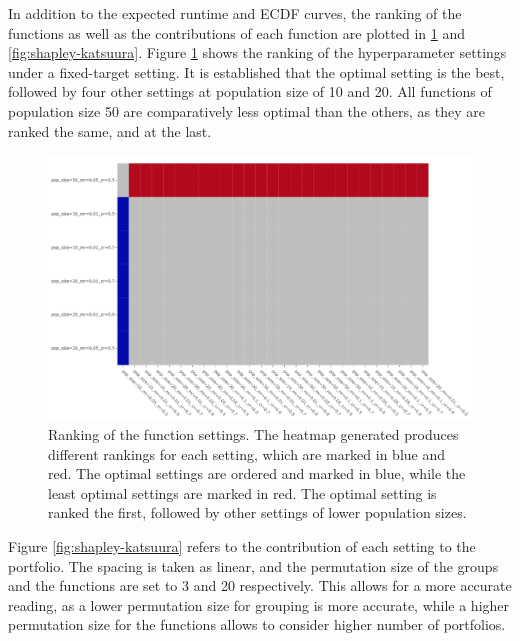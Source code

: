 \documentclass{article}
\begin{document}
In addition to the expected runtime and ECDF curves, the ranking of the functions as well as the contributions of each function are plotted in \ref{fig:ranking-Katsuura} and \ref{fig:shapley-katsuura}. Figure \ref{fig:ranking-Katsuura} shows the ranking of the hyperparameter settings under a fixed-target setting. It is established that the optimal setting is the best, followed by four other settings at population size of 10 and 20. All functions of population size 50 are comparatively less optimal than the others, as they are ranked the same, and at the last. \\
\begin{figure}[h!]
    \centering
    \includegraphics[width=1\linewidth]{Graphs/Katsuura/Ranking.png}
    \caption{Ranking of the function settings. The heatmap generated produces different rankings for each setting, which are marked in blue and red. The optimal settings are ordered and marked in blue, while the least optimal settings are marked in red. The optimal setting is ranked the first, followed by other settings of lower population sizes.}
    \label{fig:ranking-Katsuura}
\end{figure}
Figure \ref{fig:shapley-katsuura} refers to the contribution of each setting to the portfolio. The spacing is taken as linear, and the permutation size of the groups and the functions are set to 3 and 20 respectively. This allows for a more accurate reading, as a lower permutation size for grouping is more accurate, while a higher permutation size for the functions allows to consider higher number of portfolios.  
\end{document}
